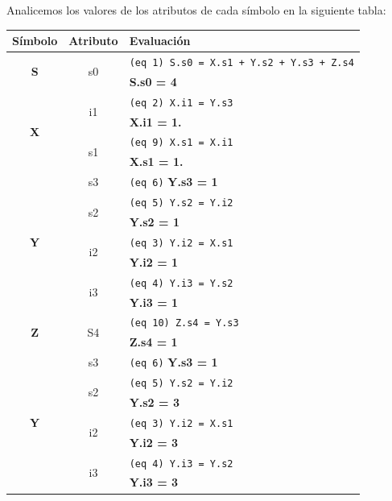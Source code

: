 Analicemos los valores de los atributos de cada símbolo en la siguiente tabla:
\begin{center}\begin{tabular}{|| c | c | l ||}
\hline  \hline
\rowcolor[rgb]{0.8, 0.8, 0.8} \textbf{Símbolo}&\textbf{Atributo}&\textbf{Evaluación}\\ \hline
\multirow{2}{*}{\textbf{S}} & \multirow{2}{*}{s0} & \texttt{(eq 1) S.s0 = X.s1 + Y.s2 + Y.s3 + Z.s4}\\ 
			&& \textbf{S.s0 = 4}\\ \hline

\multirow{4}{*}{\textbf{X}}& \multirow{2}{*}{i1} & \texttt{(eq 2) X.i1 = Y.s3}\\ 
					&& \textbf{X.i1 = 1.}\\
		  & \multirow{2}{*}{s1} & \texttt{(eq 9) X.s1 = X.i1}\\ 
					&& \textbf{X.s1 = 1.}\\ \hline

\multirow{7}{*}{\textbf{Y}}& s3  & \texttt{(eq 6)} \textbf{Y.s3 = 1}\\
&\multirow{2}{*}{s2}& 	\texttt{(eq 5) Y.s2 = Y.i2}\\
			&& \textbf{Y.s2 = 1} \\
&\multirow{2}{*}{i2}	& \texttt{(eq 3) Y.i2 = X.s1}\\
			&& \textbf{Y.i2 = 1} \\
&\multirow{2}{*}{i3}	& \texttt{(eq 4) Y.i3 = Y.s2}\\
			&& \textbf{Y.i3 = 1} \\ \hline

\multirow{2}{*}{\textbf{Z}} & \multirow{2}{*}{S4} & \texttt{(eq 10) Z.s4 = Y.s3}\\
			&& \textbf{Z.s4 = 1} \\ \hline

\multirow{7}{*}{\textbf{Y}}& s3  & \texttt{(eq 6)} \textbf{Y.s3 = 1}\\
&\multirow{2}{*}{s2}& 	\texttt{(eq 5) Y.s2 = Y.i2}\\
			&& \textbf{Y.s2 = 3} \\ 
&\multirow{2}{*}{i2}	& \texttt{(eq 3) Y.i2 = X.s1}\\
			&& \textbf{Y.i2 = 3} \\
&\multirow{2}{*}{i3}	& \texttt{(eq 4) Y.i3 = Y.s2}\\
			&& \textbf{Y.i3 = 3} \\ \hline  \hline


\end{tabular}\end{center}

